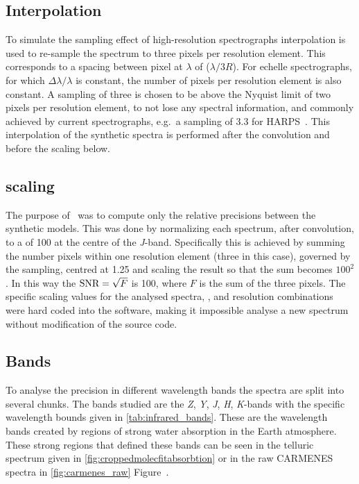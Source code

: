 \subsection{Interpolation}
\label{subsec:orginal_interpolation}
To simulate the sampling effect of high-resolution spectrographs interpolation is used to re-sample the spectrum to three pixels per resolution element.
This corresponds to a spacing between pixel at \(\lambda\) of (\(\lambda / 3R\)).
For echelle spectrographs, for which \(\Delta\lambda/\lambda\) is constant, the number of pixels per resolution element is also constant.
A sampling of three is chosen to be above the Nyquist limit of two pixels per resolution element, to not lose any spectral information, and commonly achieved by current spectrographs, e.g.\ a sampling of 3.3 for HARPS~\citep{mayor_setting_2003}.
This interpolation of the synthetic spectra is performed after the convolution and before the \snr scaling below.

\subsection{\snr{} scaling}
\label{subsec:orginal_snr_scaling}
The purpose of~\citet{figueira_radial_2016} was to compute only the relative precisions between the synthetic models.
This was done by normalizing each spectrum, after convolution, to a \snr{} of 100 at the centre of the \emph{J}-band.
Specifically this is achieved by summing the number pixels within one resolution element (three in this case), governed by the sampling, centred at 1.25\um{} and scaling the result so that the sum becomes \(100^2\).
In this way the \(\textrm{SNR}{} =\sqrt{F}\) is 100, where \(F\) is the sum of the three pixels.
The specific scaling values for the analysed spectra, \Vsini{}, and resolution combinations were hard coded into the software, making it impossible analyse a new spectrum without modification of the source code.

\subsection{Bands}
\label{subsec:orginal_bands}
To analyse the precision in different wavelength bands the spectra are split into several chunks.
The bands studied are the \emph{Z}, \emph{Y}, \emph{J}, \emph{H}, \emph{K}-bands with the specific wavelength bounds given in \cref{tab:infrared_bands}.
These are the \nir{} wavelength bands created by regions of strong water absorption in the Earth atmosphere.
These strong  regions that defined these bands can be seen in the telluric spectrum given in \cref{fig:croppedmolecfitabsorbtion} or in the raw {CARMENES} spectra in \cref{fig:carmenes_raw} Figure~.

